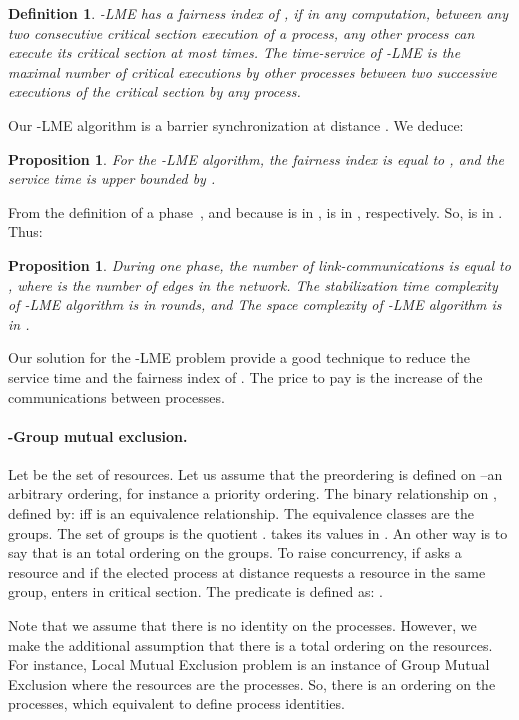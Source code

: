 \documentclass[11pt]{article}
\newtheorem{definition}[theorem]{Definition}
\newtheorem{proposition}[theorem]{Proposition}
\begin{document}
\begin{definition}
-LME has a fairness index of , if in any computation, between
any two consecutive critical section execution of a process, any other
process can execute its critical section at most  times. The time-service
of -LME is the maximal number of critical executions by other
processes between two successive executions of the critical section by any
process.
\end{definition}

Our -LME algorithm is a barrier synchronization at distance . We deduce:


\begin{proposition}
For the -LME algorithm, the fairness index is  equal to , and 
the service time is upper bounded by .
\end{proposition}

From the definition of a phase~\cite{BPV04b}, and because  is in ,  
 is in , respectively. So,  is in . Thus:	

\begin{proposition}
 During one phase, the number of link-communications is equal to , where  is the number of edges
in the network.
 The stabilization time complexity of -LME algorithm is in  rounds, and
 The space complexity of -LME algorithm is in .
\end{proposition}

Our solution for the -LME problem provide a good technique to reduce the service time 
and the fairness index of . The price to pay is the increase of the communications between
processes.

\paragraph{-Group mutual exclusion.} 

Let  be the set of resources. Let us assume 
that the preordering  is
defined on  --an arbitrary ordering, for instance a priority ordering. The
binary relationship on , defined by:  iff    is an equivalence relationship. The equivalence classes are the
groups. The set of groups is the quotient . 
 takes its values in . An other way is to say that  is an total ordering on the groups.
To raise concurrency, if  asks a resource  and if the elected process at distance  requests a resource in the same group,   enters in critical section.
The predicate  is defined as: .  

Note that we assume that there is no identity on the processes.  However, we make the additional assumption 
that there is a total ordering on the resources. For instance, Local Mutual Exclusion problem is an instance of 
Group Mutual Exclusion where the resources are the processes.  So, there is an ordering on the processes, which equivalent 
to define process identities.
\end{document}
